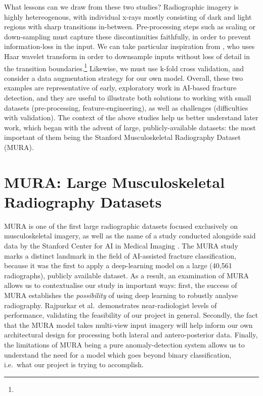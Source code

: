 What lessons can we draw from these two studies? Radiographic imagery is highly hetereogenous, with individual x-rays mostly consisting of dark and light regions with sharp transitions in-between. Pre-processing steps such as scaling or down-sampling must capture these discontinuities faithfully, in order to prevent information-loss in the input. We can take particular inspiration from \autocite{Dimililer2017}, who uses Haar wavelet transform in order to downsample inputs without loss of detail in the transition boundaries.\footnote{} Likewise, we must use k-fold cross validation, and consider a data augmentation strategy for our own model. Overall, these two examples are representative of early, exploratory work in AI-based fracture detection, and they are useful to illustrate both solutions to working with small datasets (pre-processing, feature-engineering), as well as challenges (difficulties with validation). The context of the above studies help us better understand later work, which began with the advent of large, publicly-available datasets: the most important of them being the Stanford Musculoskeletal Radiography Dataset (MURA).

\section{MURA: Large Musculoskeletal Radiography Datasets}



MURA is one of the first large radiographic datasets focused exclusively on musculoskeletal imagery, as well as the name of a study conducted alongside said data by the Stanford Center for AI in Medical Imaging \autocite{MURA2017}. The MURA study marks a distinct landmark in the field of AI-assisted fracture classification, because it was the first to apply a deep-learning model on a large (40,561 radiographs), publicly available dataset. As a result, an examination of MURA allows us to contextualise our study in important ways: first, the success of MURA establishes the \emph{possibility} of using deep learning to robustly analyse radiography. Rajpurkar et al.~demonstrates near-radiologist levels of performance, validating the feasibility of our project in general. Secondly, the fact that the MURA model takes multi-view input imagery will help inform our own architectural design for processing both lateral and antero-posterior data. Finally, the limitations of MURA being a pure anomaly-detection system allows us to understand the need for a model which goes beyond binary classification, i.e.~what our project is trying to accomplish. 

